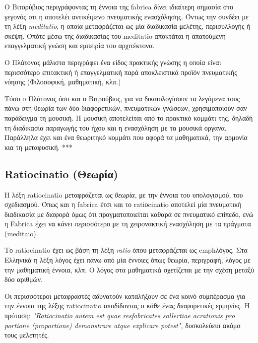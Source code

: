 Ο Βιτορύβιος περιγράφοντας τη έννοια της fabrica δίνει ιδιαίτερη σημασία στο γεγονός οτι η αποτελέι αντικέιμενο πνευματικής ενασχόλησης. Όντως την συνδέει με τη λέξη \emph{meditatio}, η οποία μεταφράζεται ως μία διαδικασία μελέτης, περισυλλογής ή σκέψη. Όπότε μέσω της διαδικασίας του meditatio αποκτάται η απατούμενη επαγγελματική γνώση και εμπειρία του αρχιτέκτονα. \cite{graham-education}

Ο Πλάτονας μάλιστα περιγράφει ένα είδος πρακτικής γνώσης η οποία είναι περισσότερο επιτακτική ή επαγγελματική παρά αποκλειστικά προϊόν πνευματικής νόησης (Φιλοσοφική, μαθηματική, κλπ.) 

Τόσο ο Πλάτονας όσο και ο Βιτρούβιος, για να δικαιολογίσουν τα λεγόμενα τους πάνω στη θεωρία των δύο διαφορετικών, πνευματικών γνώσεων, χρησιμοποιούν σαν παράδειγμα τη μουσική. Η μουσική αποτελείται από το πρακτικό κομμάτι της, δηλαδή τη διαδικασία παραγωγής του ήχου και η ενασχόληση με τα μουσικά οργανα. Παράλληλα έχει και ένα θεωριτηκό κομμάτι που αφορά τα μαθηματικά, την αρμονία κια τη μεταφυσική. *** \cite{graham-education}

\subsection{Ratiocinatio (Θεωρία)}

Η λέξη ratiocinatio μεταφράζεται ως \emph{θεωρία}, με την έννοια του υπολογισμού, του σχεδιασμού.  Όπως και η fabrica έτσι και το ratiοcinatio αποτελεί μία πνευματική διαδικασία με διαφορά όμως ότι πραγματοποιείται καθαρά σε πνευματικό επίπεδο, ενώ η Fabrica έχει να κάνει περισσότερο με τη χειρονακτική ενασχόληση με τα πράγματα (meditaio). \cite[σ. 85-86]{vitruvius-lefas}

Το ratiocinatio έχει ως βάση τη λέξη \emph{ratio} όπου μεταφράζεται ως emph{λόγος}. Στα Ελληνικά η λέξη λόγος έχει πάνω από μία έννοιες όπως θεωρία, περιγραφή, λόγος με την μαθηματική έννοια, κλπ. Ο λόγος στα μαθηματικά σχετίζεται με την σχέση μεταξύ δύο αριθμών. \cite{graham-education}

Οι περισσότεροι μεταφραστές αδυνατούν καταλήξουν σε ένα κοινό συμπέρασμα για την έννοια της λέξης ratiocinatio αποδίδοντας ο κάθε ένας διαφορετικές ερμηνίες. Η πρόταση:  \textit{"Ratiocinatio autem est quae resfabricates sollertiae acrationis pro portione (proportione) demonstrare atque explicare potest"}, δυσκολεύευι ακόμα τους μελετητές. 


